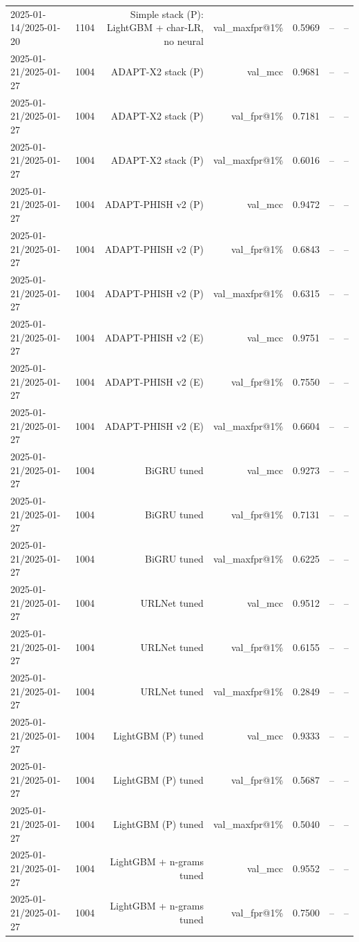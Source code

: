 \begin{table}[t]
\begin{tabular}{llrrrrr}
2025-01-14/2025-01-20 & 1104 & Simple stack (P): LightGBM + char-LR, no neural & val\_maxfpr@1\% & 0.5969 & -- & -- \\
2025-01-21/2025-01-27 & 1004 & ADAPT-X2 stack (P) & val\_mcc & 0.9681 & -- & -- \\
2025-01-21/2025-01-27 & 1004 & ADAPT-X2 stack (P) & val\_fpr@1\% & 0.7181 & -- & -- \\
2025-01-21/2025-01-27 & 1004 & ADAPT-X2 stack (P) & val\_maxfpr@1\% & 0.6016 & -- & -- \\
2025-01-21/2025-01-27 & 1004 & ADAPT-PHISH v2 (P) & val\_mcc & 0.9472 & -- & -- \\
2025-01-21/2025-01-27 & 1004 & ADAPT-PHISH v2 (P) & val\_fpr@1\% & 0.6843 & -- & -- \\
2025-01-21/2025-01-27 & 1004 & ADAPT-PHISH v2 (P) & val\_maxfpr@1\% & 0.6315 & -- & -- \\
2025-01-21/2025-01-27 & 1004 & ADAPT-PHISH v2 (E) & val\_mcc & 0.9751 & -- & -- \\
2025-01-21/2025-01-27 & 1004 & ADAPT-PHISH v2 (E) & val\_fpr@1\% & 0.7550 & -- & -- \\
2025-01-21/2025-01-27 & 1004 & ADAPT-PHISH v2 (E) & val\_maxfpr@1\% & 0.6604 & -- & -- \\
2025-01-21/2025-01-27 & 1004 & BiGRU tuned & val\_mcc & 0.9273 & -- & -- \\
2025-01-21/2025-01-27 & 1004 & BiGRU tuned & val\_fpr@1\% & 0.7131 & -- & -- \\
2025-01-21/2025-01-27 & 1004 & BiGRU tuned & val\_maxfpr@1\% & 0.6225 & -- & -- \\
2025-01-21/2025-01-27 & 1004 & URLNet tuned & val\_mcc & 0.9512 & -- & -- \\
2025-01-21/2025-01-27 & 1004 & URLNet tuned & val\_fpr@1\% & 0.6155 & -- & -- \\
2025-01-21/2025-01-27 & 1004 & URLNet tuned & val\_maxfpr@1\% & 0.2849 & -- & -- \\
2025-01-21/2025-01-27 & 1004 & LightGBM (P) tuned & val\_mcc & 0.9333 & -- & -- \\
2025-01-21/2025-01-27 & 1004 & LightGBM (P) tuned & val\_fpr@1\% & 0.5687 & -- & -- \\
2025-01-21/2025-01-27 & 1004 & LightGBM (P) tuned & val\_maxfpr@1\% & 0.5040 & -- & -- \\
2025-01-21/2025-01-27 & 1004 & LightGBM + n-grams tuned & val\_mcc & 0.9552 & -- & -- \\
2025-01-21/2025-01-27 & 1004 & LightGBM + n-grams tuned & val\_fpr@1\% & 0.7500 & -- & -- \\

\end{tabular}
\end{table}
